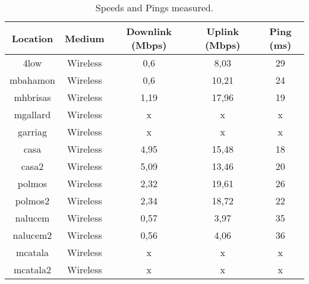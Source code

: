 \begin{table}[ht]
\caption[Speed Test: Speeds and Ping measured]{Speeds and Pings measured. }
\begin{center}
\begin{tabular}{|c||c|c|c|c|}
\hline
Location  & Medium  & Downlink (Mbps) & Uplink (Mbps) & Ping (ms)\\ \hline\hline
 4low     & Wireless & 0,6            & 8,03          & 29 \\ \hline       %
 mbahamon & Wireless & 0,6            & 10,21         & 24 \\ \hline       %
 mhbrisas & Wireless & 1,19           & 17,96         & 19 \\ \hline       %
 mgallard & Wireless & x              & x             & x \\ \hline        %
 garriag  & Wireless & x              & x             & x \\ \hline        %
 casa     & Wireless & 4,95           & 15,48         & 18 \\ \hline       %
 casa2    & Wireless & 5,09           & 13,46         & 20 \\ \hline       %
 polmos   & Wireless & 2,32           & 19,61         & 26 \\ \hline       %
 polmos2  & Wireless & 2,34           & 18,72         & 22 \\ \hline       %
 nalucem  & Wireless & 0,57           & 3,97          & 35 \\ \hline       %
 nalucem2 & Wireless & 0,56           & 4,06          & 36 \\ \hline       %
 mcatala  & Wireless & x              & x 			  & x \\ \hline        %
 mcatala2 & Wireless & x              & x 			  & x \\ \hline        %
\end{tabular}
\end{center}
\label{table:speeds}
\end{table}

